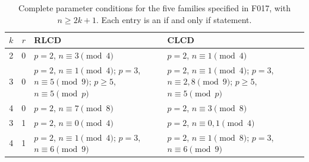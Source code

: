\documentclass[11pt]{article}
\begin{document}
\begin{table}[ht]
\centering\small
\begin{tabular}{ccp{}p{}}
\toprule
$k$&$r$&RLCD&CLCD\\\midrule
2&0&$p=2$, $n\equiv3\pmod4$&$p=2$, $n\equiv1\pmod4$\\
3&0&$p=2$, $n\equiv1\pmod4$; $p=3$, $n\equiv5\pmod9$;
$p\geq5$, $n\equiv5\pmod p$&$p=2$, $n\equiv1\pmod4$;
$p=3$, $n\equiv2,8\pmod9$; $p\geq5$, $n\equiv5\pmod p$\\
4&0&$p=2$, $n\equiv7\pmod8$&$p=2$, $n\equiv3\pmod8$\\
3&1&$p=2$, $n\equiv0\pmod4$&$p=2$, $n\equiv0,1\pmod4$\\
4&1&$p=2$, $n\equiv1\pmod4$; $p=3$, $n\equiv6\pmod9$
&$p=2$, $n\equiv1\pmod8$; $p=3$, $n\equiv6\pmod9$\\
\bottomrule
\end{tabular}
\caption{Complete parameter conditions for the five families specified in
F017, with $n\geq2k+1$. Each entry is an if and only if statement.}
\label{tab:families}
\end{table}
\end{document}
